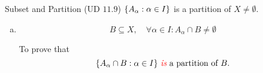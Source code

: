 \begin{frame}{}
  \begin{exampleblock}{Subset and Partition (UD $11.9$)}
    $\{A_{\alpha}: \alpha \in I\}$ is a partition of $X \neq \emptyset$.
    \begin{enumerate}[(a)]
      \item 
	\[
	  B \subseteq X, \quad \forall \alpha \in I: A_{\alpha} \cap B \neq \emptyset
	\]

	To prove that
	\[
	  \{A_{\alpha} \cap B: \alpha \in I\} \text{ \textcolor{red}{\it is} a partition of } B.
	\]
    \end{enumerate}
  \end{exampleblock}

\end{frame}
